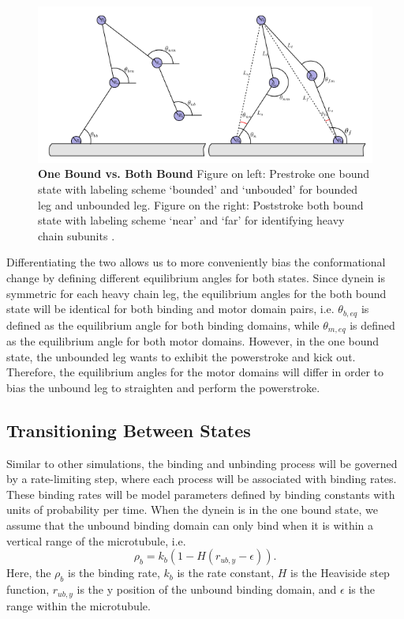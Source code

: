 \begin{figure}[H]
	\centering
	\includegraphics[width=0.8\columnwidth]{Figures/OB_vs_BB.PNG}
	\caption[One Bound vs. Both Bound]{\textbf{One Bound vs. Both Bound} Figure on left: Prestroke one bound state with labeling scheme ‘bounded’ and ‘unbouded’ for bounded leg and unbounded leg. Figure on the right: Poststroke both bound state with labeling scheme ‘near’ and ‘far’ for identifying heavy chain subunits \cite{Capek2017}.}
	\label{fig:final_disp}
\end{figure}

Differentiating the two allows us to more conveniently bias the conformational change by defining different equilibrium angles for both states. Since dynein is symmetric for each heavy chain leg, the equilibrium angles for the both bound state will be identical for both binding and motor domain pairs, i.e. $\theta_{b,eq}$ is defined as the equilibrium angle for both binding domains, while $\theta_{m,eq}$ is defined as the equilibrium angle for both motor domains. However, in the one bound state, the unbounded leg wants to exhibit the powerstroke and kick out. Therefore, the equilibrium angles for the motor domains will differ in order to bias the unbound leg to straighten and perform the powerstroke. 


\subsection{Transitioning Between States}

Similar to other simulations, the binding and unbinding process will be governed by a rate-limiting step, where each process will be associated with binding rates. These binding rates will be model parameters defined by binding constants with units of probability per time. When the dynein is in the one bound state, we assume that the unbound binding domain can only bind when it is within a vertical range of the microtubule, i.e.
\begin{equation}
	\rho_b=k_b(1-H(r_{ub,y}-\epsilon)).
\end{equation} 
Here, the $\rho_b$ is the binding rate, $k_b$ is the rate constant, $H$ is the Heaviside step function, $r_{ub,y}$ is the y position of the unbound binding domain, and $\epsilon$ is the range within the microtubule.


